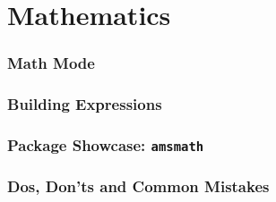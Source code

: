 \part{Mathematics}
\section{Math Mode}

\section{Building Expressions}

\section{Package Showcase: \texttt{amsmath}}

\section{Dos, Don'ts and Common Mistakes}

